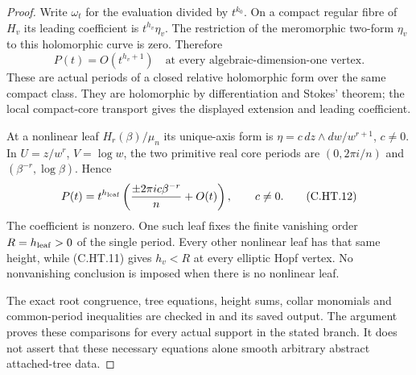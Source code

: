 \begin{proof}
Write $\omega_t$ for the evaluation divided by $t^{k_0}$.
On a compact regular fibre of $H_v$ its leading coefficient is
$t^{h_v}\eta_v$. The restriction of the meromorphic two-form
$\eta_v$ to this holomorphic curve is zero. Therefore
\[
                     P(t)=O(t^{h_v+1})
       \quad\text{at every algebraic-dimension-one vertex}.
                                                        \tag{C.HT.11}
\]
These are actual periods of a closed relative holomorphic form
over the same compact class. They are holomorphic by
differentiation and Stokes' theorem; the local compact-core
transport gives the displayed extension and leading coefficient.

At a nonlinear leaf
$H_r(\beta)/\mu_n$ its unique-axis form is
$\eta=c\,dz\wedge dw/w^{r+1}$, $c\ne0$. In
$U=z/w^r$, $V=\log w$, the two primitive real core periods are
$(0,2\pi i/n)$ and $(\beta^{-r},\log\beta)$. Hence
\[
 P(t)=t^{h_{\rm leaf}}
       \left(\frac{\pm2\pi i c\beta^{-r}}{n}+O(t)\right),
                    \qquad c\ne0.                     \tag{C.HT.12}
\]
The coefficient is nonzero. One such leaf fixes the finite
vanishing order $R=h_{\rm leaf}>0$ of the single period.
Every other nonlinear leaf has that same height, while
(C.HT.11) gives $h_v<R$ at every elliptic Hopf vertex.
No nonvanishing conclusion is imposed when there is no nonlinear
leaf.

The exact root congruence, tree equations, height sums, collar
monomials and common-period inequalities are checked in
 and its saved output. The
argument proves these comparisons for every actual support in
the stated branch. It does not assert that these necessary
equations alone smooth arbitrary abstract attached-tree data.
\end{proof}
